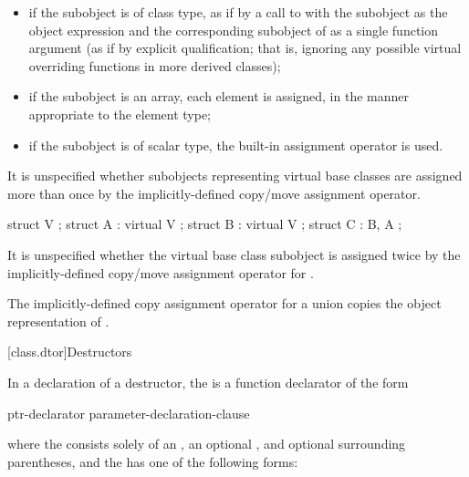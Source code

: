 \begin{itemize}
\item
if the subobject is of class type,
as if by a call to  with the subobject as the object expression
and the corresponding subobject of  as a single function argument
(as if by explicit qualification; that is,
ignoring any possible virtual overriding functions in more derived classes);
\item
if the subobject is an array, each element is assigned,
in the manner appropriate to the element type;
\item
if the subobject is of scalar type,
the built-in assignment operator is used.
\end{itemize}

%
It is unspecified whether subobjects representing virtual base classes
are assigned more than once by the implicitly-defined copy/move assignment
operator.
\begin{example}

\begin{codeblock}
struct V { };
struct A : virtual V { };
struct B : virtual V { };
struct C : B, A { };
\end{codeblock}

It is unspecified whether the virtual base class subobject
is assigned twice by the implicitly-defined copy/move assignment operator for
.
\end{example}

\pnum
The implicitly-defined copy assignment operator for a
union  copies the object representation of .%
%

[class.dtor]{Destructors}%
%
%

\pnum
In a declaration of a destructor, the  is a
function declarator of the form

\begin{ncbnf}
ptr-declarator \terminal{(} parameter-declaration-clause \terminal{)}  
\end{ncbnf}

where the  consists solely of an
, an optional ,
and optional surrounding parentheses, and the  has
one of the following forms:

